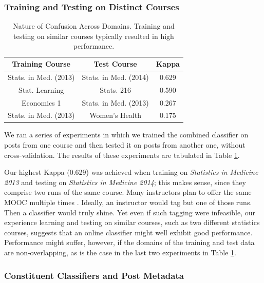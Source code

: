 \documentclass{edm_template}
\begin{document}
\subsubsection{Training and Testing on Distinct Courses}

\begin{table}[h!]
       \centering
       \begin{tabular}{|c|c|c|}
       \hline
       Training Course                & Test Course                    & Kappa \\ \hline
       Stats. in Med. (2013)  & Stats. in Med. (2014)  & 0.629 \\ \hline
       Stat. Learning           & Stats. 216                 & 0.590 \\ \hline
       Economics 1                    & Stats. in Med. (2013)  & 0.267 \\ \hline
       Stats. in Med. (2013)  & Women's Health                 & 0.175 \\ \hline
       \end{tabular}
       \caption{\textnormal{
       Nature of Confusion Across Domains. Training and testing on similar courses typically resulted in high performance.
       }} 
       \label{table:across_courses} %
\end{table}

We ran a series of experiments in which we trained the combined classifier on posts from one course and then tested it on posts from another one, without cross-validation. The results of these experiments are tabulated in Table \ref{table:across_courses}. 

Our highest Kappa (0.629) was achieved when training on \emph{Statistics in Medicine 2013} and testing on \emph{Statistics in Medicine 2014}; this makes sense, since they comprise two runs of the same course. Many instructors plan to offer the same MOOC multiple times \cite{hollands2014moocs}. Ideally, an instructor would tag but one of those runs. Then a classifier would truly shine. Yet even if such tagging were infeasible, our experience learning and testing on similar courses, such as two different statistics courses, suggests that an online classifier might well exhibit good performance. Performance might suffer, however, if the domains of the training and test data are non-overlapping, as is the case in the last two experiments in Table \ref{table:across_courses}.
\vspace{-0.3cm}
\subsubsection{Constituent Classifiers and Post Metadata}
\end{document}
